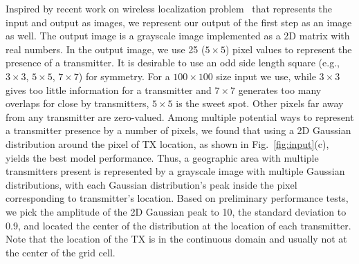Inspired by recent work on wireless localization problem~\cite{mobicom20-deeploc} that represents the input and output as images, we represent our output of the first step as an image as well.
The output image is a grayscale image implemented as a 2D matrix with real numbers. 
In the output image, we use 25 ($5\times 5$) pixel values to represent the presence of a transmitter. 
It is desirable to use an odd side length square (e.g., $3\times 3$, $5\times5$, $7\times 7$) for symmetry. 
For a $100\times 100$ size input we use, while $3\times3$ gives too little information for a transmitter and $7\times 7$ generates too many overlaps for close by transmitters, $5\times 5$ is the sweet spot.
Other pixels far away from any transmitter are zero-valued.
Among multiple potential ways to represent a transmitter presence by a number of pixels, we found
that using a 2D Gaussian distribution around the pixel of TX location, as shown in Fig.~\ref{fig:input}(c), yields the best model performance.
Thus, a geographic area with multiple transmitters present is represented by a grayscale image with multiple Gaussian distributions, with each Gaussian distribution's peak inside the pixel corresponding to transmitter's location. 
Based on preliminary performance
tests, we pick the amplitude of the 2D Gaussian peak to 10, the standard deviation to 0.9, and located the center of the distribution at the location of each transmitter.
Note that the location of the TX is in the continuous domain and usually not at the center of the grid cell.



